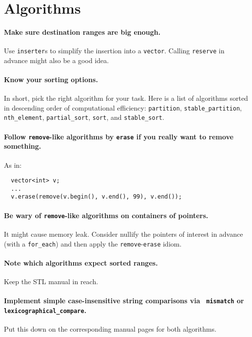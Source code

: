 \documentclass{article}
\begin{document}
\section{Algorithms}

\paragraph{Make sure destination ranges are big enough.}  Use {\tt inserter}s
to simplify the insertion into a {\tt vector}.  Calling {\tt reserve} in
advance might also be a good idea.

\paragraph{Know your sorting options.} In short, pick the right algorithm for
your task.  Here is a list of algorithms sorted in descending order of
computational efficiency: {\tt partition}, {\tt stable\_partition}, {\tt
nth\_element}, {\tt partial\_sort}, {\tt sort}, and {\tt stable\_sort}.

\paragraph{Follow {\tt remove}-like algorithms by {\tt erase} if you really
want to remove something.}  As in:
\begin{verbatim}
  vector<int> v;
  ...
  v.erase(remove(v.begin(), v.end(), 99), v.end());
\end{verbatim}

\paragraph{Be wary of {\tt remove}-like algorithms on containers of pointers.}
It might cause memory leak.  Consider nullify the pointers of interest in
advance (with a {\tt for\_each}) and then apply the {\tt remove}-{\tt erase}
idiom.

\paragraph{Note which algorithms expect sorted ranges.} Keep the STL manual in
reach.

\paragraph{Implement simple case-insensitive string comparisons via {\tt
mismatch} or {\tt lexicographical\_compare}.}  Put this down on the
corresponding manual pages for both algorithms.
\end{document}
